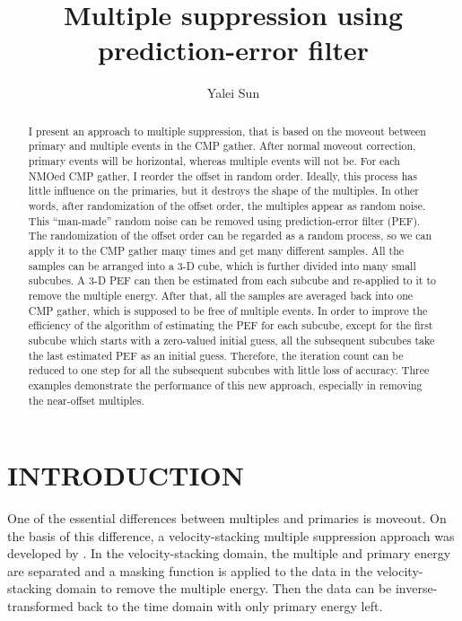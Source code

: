 
\title{Multiple suppression using prediction-error filter}

\author{Yalei Sun}

\maketitle

\begin{abstract}
I present an approach to multiple suppression, that is 
based on the moveout between primary and multiple events in the CMP gather.
After normal moveout correction, primary events will be horizontal, 
whereas multiple events will not be. 
For each NMOed CMP gather, I reorder the 
offset in random order. Ideally, this process has little influence on the 
primaries, but 
it destroys the shape of the multiples. In other words, after randomization 
of the offset order, the multiples appear as random noise. This ``man-made''
random noise can be removed using prediction-error filter (PEF). 
The randomization of the offset order can be regarded as a random process, 
so we can apply it to the CMP gather many times and get many different 
samples. All the samples can be arranged into a 3-D cube, which is further 
divided into many small subcubes. A 3-D PEF can then be estimated from each 
subcube and re-applied 
to it to remove the multiple energy. After that, all the samples are averaged 
back into one CMP gather, which is supposed to be free of multiple events. 
In order to improve the efficiency of the 
algorithm of estimating the PEF for each subcube, except for the first 
subcube which starts with a zero-valued initial guess, all the subsequent 
subcubes take the last estimated PEF as an initial guess. 
Therefore, the iteration 
count can be reduced to one step for all the subsequent subcubes with little 
loss of accuracy. 
Three examples demonstrate the performance of this new approach, especially in 
removing the near-offset multiples.
\end{abstract}


\section{INTRODUCTION}

One of the essential differences between multiples and primaries is moveout. 
On the basis of this difference, a velocity-stacking multiple suppression
approach was developed by \cite{Lumley.sep.82.25}. In the 
velocity-stacking domain, the multiple and primary energy are separated and 
a masking function is applied to the data in the velocity-stacking domain to 
remove the multiple energy. Then the data can be
inverse-transformed back to the time domain with only primary energy left.

